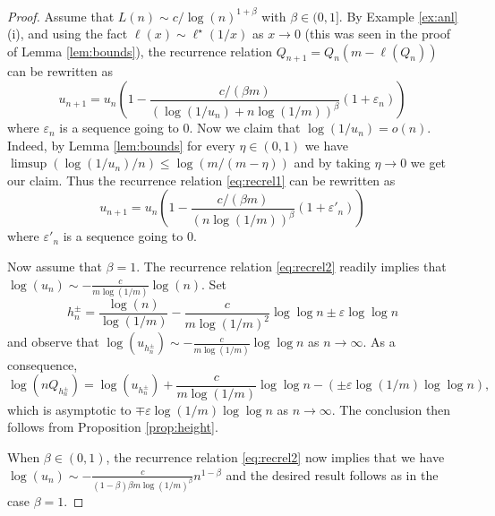 \documentclass[a4paper,11pt]{article}
\begin{document}
\begin{proof}
Assume that $L(n) \sim c/\log(n)^{1+\beta}$ with $\beta \in (0,1]$. By Example \ref{ex:anl} (i), and using the fact $\ell(x)\sim\ell^\star(1/x)$ as $x \rightarrow 0$  (this was seen in the proof of Lemma \ref{lem:bounds}), the recurrence relation  $Q_{n+1}=Q_n(m-\ell(Q_n))$ can be rewritten as
\begin{equation}
    \label{eq:recrel1}
u_{n+1}=u_n \left(1- \frac{c/(\beta m)}{\left(\log(1/u_n)+n\log(1/m)\right)^\beta}(1+\varepsilon_n)\right)
\end{equation}
where $\varepsilon_n$ is a sequence going to $0$. Now we claim that $\log(1/u_n)=o(n)$. Indeed, by Lemma \ref{lem:bounds} for every $\eta \in (0,1)$ we have $\limsup ( \log(1/u_n)/n) \leq \log (m/(m-\eta))$ and by taking $\eta \rightarrow 0$ we get our claim. Thus the recurrence relation \eqref{eq:recrel1} can be rewritten as
\begin{equation}
    \label{eq:recrel2}
u_{n+1}=u_n \left(1- \frac{c/(\beta m)}{\left(n\log(1/m)\right)^\beta}(1+\varepsilon'_n)\right)
\end{equation}
where $\varepsilon'_n$ is a sequence going to $0$. 

Now assume that $\beta=1$. The recurrence relation \eqref{eq:recrel2} readily implies that  $\log(u_n) \sim  - \frac{c}{ m \log(1/m)} \log (n)$. Set
$$h^{\pm}_n= \frac{\log(n)}{\log(1/m)} - \frac{c}{ m \log(1/m)^2} \log \log n \pm  \varepsilon \log \log n$$
and observe that $\log(u_{h^\pm_n}) \sim - \frac{c}{ m \log(1/m)} \log \log n$ as $n\rightarrow \infty$. As a consequence,
$$\log \left(n Q_{ h^\pm_{n}}\right) =\log(u_{h^\pm_n}) +  \frac{c}{ m \log(1/m)} \log \log n -(\pm \varepsilon \log(1/m) \log \log n),$$
which is asymptotic to $\mp \varepsilon \log(1/m) \log \log n$ as $n \rightarrow \infty$. 
The conclusion then follows from Proposition \ref{prop:height}.

When $\beta \in (0,1)$, the recurrence relation \eqref{eq:recrel2} now implies that  we have $\log(u_n) \sim  - \frac{c}{(1-\beta)\beta m \log(1/m)^\beta} n^{1-\beta}$ and the desired result follows as in the case $\beta=1$.
\end{proof}
\end{document}
